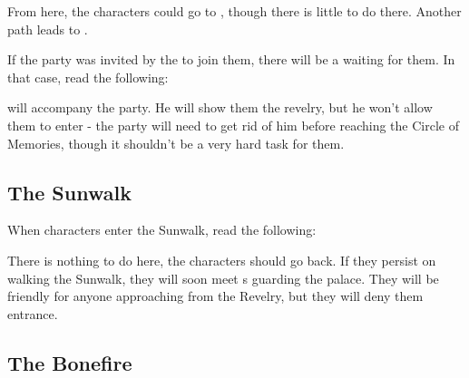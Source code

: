 
From here, the characters could go to , though there is little to do there. Another path leads to .

If the party was invited by the \npcFractionCult{} to join them, there will be a \enemyCultist{} waiting for them. In that case, read the following:


\npcRevelerGuide{} will accompany the party. He will show them the revelry, but he won't allow them to enter  - the party will need to get rid of him before reaching the Circle of Memories, though it shouldn't be a very hard task for them.



\newpage
\subsection{The Sunwalk}
\label{ssec:revelrySunwalk}

When characters enter the Sunwalk, read the following:


There is nothing to do here, the characters should go back. If they persist on walking the Sunwalk, they will soon meet \enemyQueensGuard{}s guarding the palace. They will be friendly for anyone approaching from the Revelry, but they will deny them entrance.





\subsection{The Bonefire}
\label{ssec:revelryBonefire}

